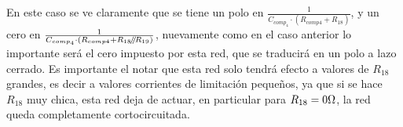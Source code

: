 En este caso se ve claramente que se tiene un polo en $\frac{1}{ C_{comp_{4}} \cdot \left( R_{comp4} + R_{18} \right) }$, y un cero en $\frac{1}{ C_{comp_{4}} \cdot \left(  R_{comp4} + R_{18} \mathbin{\!/\mkern-5mu/\!} R_{19}  \right) }$, nuevamente como en el caso anterior lo importante será el cero impuesto por esta red, que se traducirá en un polo a lazo cerrado. Es importante el notar que esta red solo tendrá efecto a valores de $R_{18}$ grandes, es decir a valores corrientes de limitación pequeños, ya que si se hace $R_{18}$ muy chica, esta red deja de actuar, en particular para $R_{18} = 0 \si[per-mode=symbol]{\ohm}$, la red queda completamente cortocircuitada.





